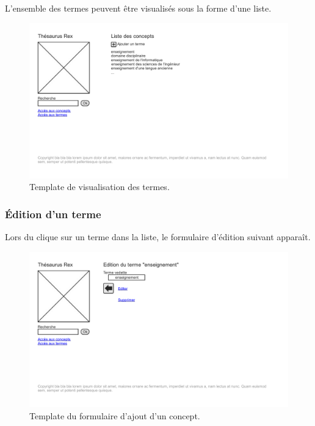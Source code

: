 L'ensemble des termes peuvent être visualisés sous la forme d'une liste.
\begin{figure}[H]
\begin{center}
\includegraphics[width=\textwidth]{files/template_termes}
\end{center}
\caption{Template de visualisation des termes.}
\end{figure}

\subsubsection{Édition d'un terme}

Lors du clique sur un terme dans la liste, le formulaire d'édition suivant apparaît.
\begin{figure}[H]
\begin{center}
\includegraphics[width=\textwidth]{files/template_terme_edit}
\end{center}
\caption{Template du formulaire d'ajout d'un concept.}
\end{figure}
